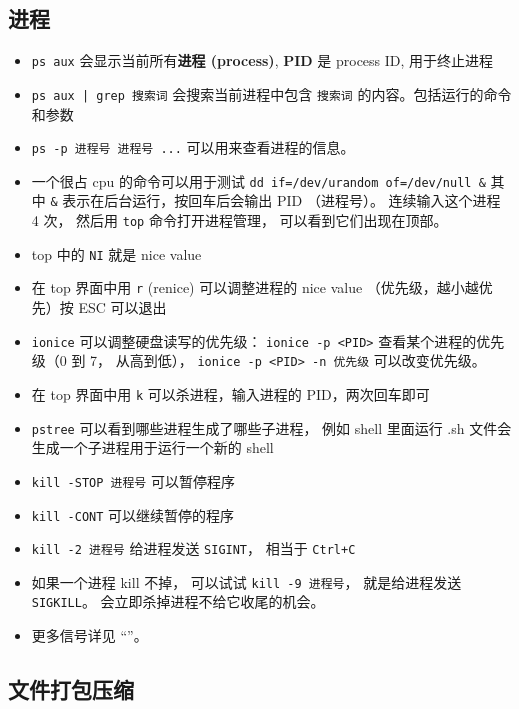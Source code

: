 \subsection{进程}
\begin{itemize}
\item \verb`ps aux` 会显示当前所有\textbf{进程 (process)}, \textbf{PID} 是 process ID, 用于终止进程
\item \verb`ps aux | grep 搜索词` 会搜索当前进程中包含 \verb`搜索词` 的内容。包括运行的命令和参数
\item \verb`ps -p 进程号 进程号 ...` 可以用来查看进程的信息。
\item 一个很占 cpu 的命令可以用于测试 \verb`dd if=/dev/urandom of=/dev/null &` 其中 \verb`&` 表示在后台运行，按回车后会输出 PID （进程号）。 连续输入这个进程 4 次， 然后用 \verb`top` 命令打开进程管理， 可以看到它们出现在顶部。
\item top 中的 \verb`NI` 就是 nice value
\item 在 top 界面中用 \verb`r` (renice) 可以调整进程的 nice value （优先级，越小越优先）按 ESC 可以退出
\item \verb`ionice` 可以调整硬盘读写的优先级： \verb`ionice -p <PID>` 查看某个进程的优先级（0 到 7， 从高到低）， \verb`ionice -p <PID> -n 优先级` 可以改变优先级。
\item 在 top 界面中用 \verb`k` 可以杀进程，输入进程的 PID，两次回车即可
\item \verb`pstree` 可以看到哪些进程生成了哪些子进程， 例如 shell 里面运行 .sh 文件会生成一个子进程用于运行一个新的 shell
\item \verb`kill -STOP 进程号` 可以暂停程序
\item \verb`kill -CONT` 可以继续暂停的程序
\item \verb`kill -2 进程号` 给进程发送 \verb`SIGINT`， 相当于 \verb`Ctrl+C`
\item 如果一个进程 kill 不掉， 可以试试 \verb`kill -9 进程号`， 就是给进程发送 \verb`SIGKILL`。 会立即杀掉进程不给它收尾的机会。
\item 更多信号详见 “”。
\end{itemize}

\subsection{文件打包压缩}
